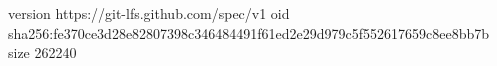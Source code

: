 version https://git-lfs.github.com/spec/v1
oid sha256:fe370ce3d28e82807398c346484491f61ed2e29d979c5f552617659c8ee8bb7b
size 262240
